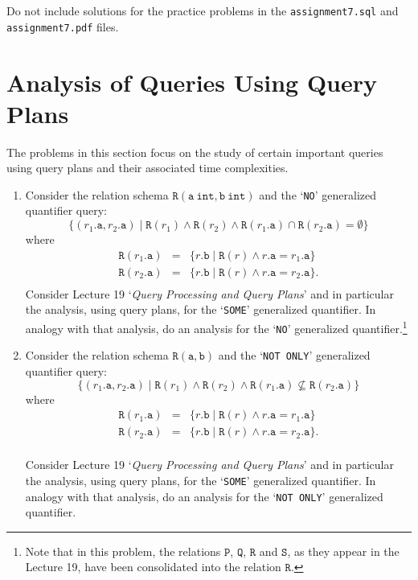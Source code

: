 \documentclass[10pt]{article}
\begin{document}
Do not include solutions for the practice problems in the {\tt assignment7.sql} and {\tt assignment7.pdf} files.


\newpage
\section{Analysis of Queries Using Query Plans}

The problems in this section focus on the study of certain important queries using query plans and their associated time complexities.


\begin{enumerate}
\item \label{NO} 
Consider the relation schema $\mathtt{R(a\ int,b\ int)}$ and the 
`{\tt NO}' generalized quantifier query:
\[\{(r_1.\mathtt{a},r_2.\mathtt{a}) \mid \mathtt{R}(r_1)\land \mathtt{R}(r_2) \land \mathtt{R}(r_1.\mathtt{a}) \cap \mathtt{R}(r_2.\mathtt{a}) = \emptyset\}\]
where
\[
\begin{array}{rcl}
\mathtt{R}(r_1.\mathtt{a}) & = & \{r.\mathtt{b} \mid \mathtt{R}(r) \land r.\mathtt{a} = r_1.\mathtt{a}\} \\
\mathtt{R}(r_2.\mathtt{a}) & = & \{r.\mathtt{b} \mid \mathtt{R}(r) \land r.\mathtt{a} = r_2.\mathtt{a}\}. \\
\end{array}
\]
Consider Lecture 19 `\emph{Query Processing and Query Plans}'
and in particular the analysis, using query plans, for the `{\tt SOME}' generalized quantifier.
In analogy with that analysis, do an analysis for the `{\tt NO}' generalized quantifier.\footnote{Note that in this problem, the relations $\mathtt{P}$, $\mathtt{Q}$, $\mathtt{R}$ and $\mathtt{S}$, as they
appear in the Lecture 19, have been consolidated into the relation $\mathtt{R}$.} 


\item \label{notonly} 
Consider the relation schema $\mathtt{R(a,b)}$ and the 
`{\tt NOT ONLY}' generalized quantifier query:
\[\{(r_1.\mathtt{a},r_2.\mathtt{a}) \mid \mathtt{R}(r_1)\land \mathtt{R}(r_2) \land \mathtt{R}(r_1.\mathtt{a}) \not\subseteq \mathtt{R}(r_2.\mathtt{a})\}\]
where
\[
\begin{array}{rcl}
\mathtt{R}(r_1.\mathtt{a}) & = & \{r.\mathtt{b} \mid \mathtt{R}(r) \land r.\mathtt{a} = r_1.\mathtt{a}\} \\
\mathtt{R}(r_2.\mathtt{a}) & = & \{r.\mathtt{b} \mid \mathtt{R}(r) \land r.\mathtt{a} = r_2.\mathtt{a}\}. \\
\end{array}
\]

Consider Lecture 19 `\emph{Query Processing and Query Plans}'
and in particular the analysis, using query plans, for the `{\tt SOME}' generalized quantifier.
In analogy with that analysis, do an analysis for the `{\tt NOT ONLY}' generalized quantifier.


\end{enumerate}
\end{document}
